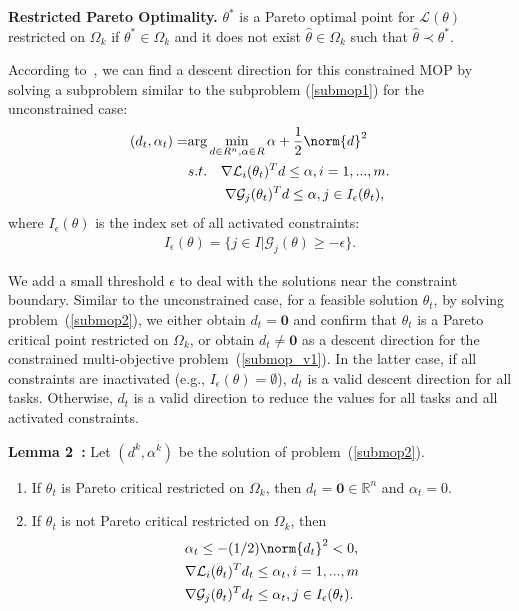 \textbf{Restricted Pareto Optimality.} $\theta^{\ast}$ is a Pareto optimal point for $\mathcal{L}(\theta)$ restricted on $\Omega_k$ if $\theta^{\ast} \in \Omega_k$ and  it does not exist $\hat \theta \in  \Omega_k$ such that $\hat \theta \prec \theta^{\ast}$.

According to~\cite{fliege2000steepest,gebken2017descent}, we can find a descent direction for this constrained MOP by solving a subproblem similar to the subproblem ({\ref{submop1}}) for the unconstrained case:
\begin{eqnarray}
    \label{submop2}
    \begin{aligned}
         (d_t,\alpha_t) = &\text{arg} \min_{d\in R^n,\alpha \in R} \alpha + \frac{1}{2} \norm{d}^2 \\
        & s.t.~~~ \nabla \mathcal{L}_i(\theta_t)^Td \leq \alpha, i = 1,...,m. \\
         & ~~~~~~~~ \nabla \mathcal{G}_j(\theta_t)^Td \leq \alpha, j \in I_{\epsilon}(\theta_t),
    \end{aligned}
\end{eqnarray}
where $I_{\epsilon}(\theta)$ is the index set of all activated constraints:
\begin{eqnarray}
    \label{act_set}
    I_{\epsilon}(\theta) = \{j \in I|\mathcal{G}_j(\theta) \geq -\epsilon \}.
\end{eqnarray}

We add a small threshold $\epsilon$ to deal with the solutions near the constraint boundary. Similar to the unconstrained case, for a feasible solution $\theta_t$, by solving problem~(\ref{submop2}), we either obtain $d_t = \boldsymbol{0}$ and confirm that $\theta_t$ is a Pareto critical point restricted on $\Omega_k$, or obtain $d_t \neq \boldsymbol{0}$ as a descent direction for the constrained multi-objective problem~(\ref{submop_v1}). In the latter case, if all constraints are inactivated (e.g., $I_{\epsilon}(\theta) = \emptyset$), $d_t$ is a valid descent direction for all tasks. Otherwise, $d_t$ is a valid direction to reduce the values for all tasks and all activated constraints.

\textbf{Lemma 2~\cite{gebken2017descent}:} Let $(d^k,\alpha^k)$ be the solution of problem~(\ref{submop2}).
\begin{enumerate}
  \item If $\theta_t$ is Pareto critical restricted on $\Omega_k$, then $d_t = \boldsymbol{0} \in \mathbb{R}^n$ and $\alpha_t = 0$.
  \item If $\theta_t$ is not Pareto critical restricted on $\Omega_k$, then
    \begin{eqnarray}\label{eq:bound_v2}
    \begin{aligned}
    & \alpha_t \leq -(1/2) \norm{d_t}^2 < 0, \\
    & \nabla \mathcal{L}_i(\theta_t)^Td_t \leq \alpha_t, i = 1,...,m \\
    & \nabla \mathcal{G}_j(\theta_t)^Td_t \leq \alpha_t, j \in I_{\epsilon}(\theta_t).
    \end{aligned}
    \end{eqnarray}
\end{enumerate}

